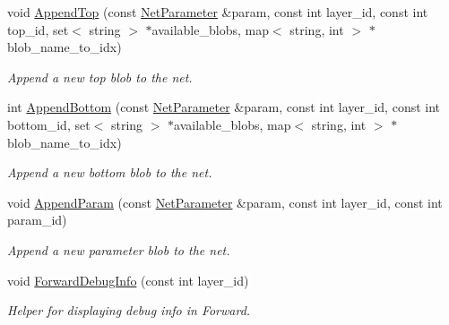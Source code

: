 \begin{DoxyCompactItemize}
\item 
\mbox{\label{classcaffe_1_1_net_a3aab736bc72b29c84dc3ee765ee453c4}} 
void \mbox{\hyperlink{classcaffe_1_1_net_a3aab736bc72b29c84dc3ee765ee453c4}{Append\+Top}} (const \mbox{\hyperlink{classcaffe_1_1_net_parameter}{Net\+Parameter}} \&param, const int layer\+\_\+id, const int top\+\_\+id, set$<$ string $>$ $\ast$available\+\_\+blobs, map$<$ string, int $>$ $\ast$blob\+\_\+name\+\_\+to\+\_\+idx)
\begin{DoxyCompactList}\small\item\em Append a new top blob to the net. \end{DoxyCompactList}\item 
\mbox{\label{classcaffe_1_1_net_a6ef3482f4e882e437c81affa77d91f32}} 
int \mbox{\hyperlink{classcaffe_1_1_net_a6ef3482f4e882e437c81affa77d91f32}{Append\+Bottom}} (const \mbox{\hyperlink{classcaffe_1_1_net_parameter}{Net\+Parameter}} \&param, const int layer\+\_\+id, const int bottom\+\_\+id, set$<$ string $>$ $\ast$available\+\_\+blobs, map$<$ string, int $>$ $\ast$blob\+\_\+name\+\_\+to\+\_\+idx)
\begin{DoxyCompactList}\small\item\em Append a new bottom blob to the net. \end{DoxyCompactList}\item 
\mbox{\label{classcaffe_1_1_net_a1fce7e829c10750543f3a79819d49393}} 
void \mbox{\hyperlink{classcaffe_1_1_net_a1fce7e829c10750543f3a79819d49393}{Append\+Param}} (const \mbox{\hyperlink{classcaffe_1_1_net_parameter}{Net\+Parameter}} \&param, const int layer\+\_\+id, const int param\+\_\+id)
\begin{DoxyCompactList}\small\item\em Append a new parameter blob to the net. \end{DoxyCompactList}\item 
\mbox{\label{classcaffe_1_1_net_a3751d6095c3d4f4384c52ad80bbd0d88}} 
void \mbox{\hyperlink{classcaffe_1_1_net_a3751d6095c3d4f4384c52ad80bbd0d88}{Forward\+Debug\+Info}} (const int layer\+\_\+id)
\begin{DoxyCompactList}\small\item\em Helper for displaying debug info in Forward. \end{DoxyCompactList}\item 

\end{DoxyCompactItemize}
